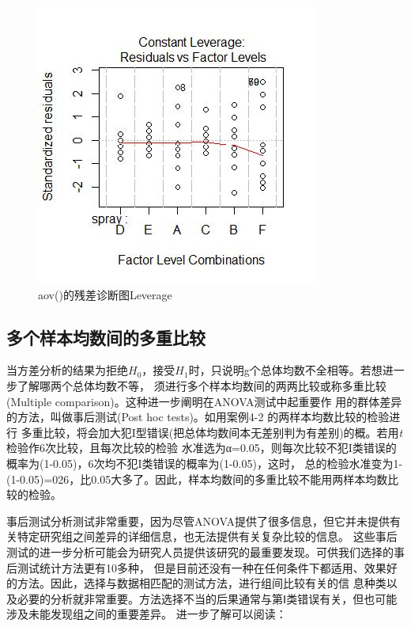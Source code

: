 \documentclass[
]{article}
\begin{document}
\begin{figure}

{\centering \includegraphics[width=0.6\linewidth]{image/diagnosticplots2} 

}

\caption{aov()的残差诊断图Leverage}\label{fig:diagnosticplots2}
\end{figure}

\hypertarget{ux591aux4e2aux6837ux672cux5747ux6570ux95f4ux7684ux591aux91cdux6bd4ux8f83}{%
\subsection{多个样本均数间的多重比较}\label{ux591aux4e2aux6837ux672cux5747ux6570ux95f4ux7684ux591aux91cdux6bd4ux8f83}}

当方差分析的结果为拒绝\(H_0\)，接受\(H_1\)时，只说明g个总体均数不全相等。若想进一步了解哪两个总体均数不等，
须进行多个样本均数间的两两比较或称多重比较(Multiple comparison)。这种进一步阐明在ANOVA测试中起重要作
用的群体差异的方法，叫做事后测试(Post hoc tests)。如用案例4-2 的两样本均数比较的检验进行
多重比较，将会加大犯I型错误(把总体均数间本无差别判为有差别)的概。若用\emph{t}检验作6次比较，且每次比较的检验
水准选为α=0.05，则每次比较不犯I类错误的概率为(1-0.05)，6次均不犯I类错误的概率为(1-0.05)，这时，
总的检验水准变为1-(1-0.05)=026，比0.05大多了。因此，样本均数间的多重比较不能用两样本均数比较的检验。

事后测试分析测试非常重要，因为尽管ANOVA提供了很多信息，但它并未提供有关特定研究组之间差异的详细信息，也无法提供有关复杂比较的信息。
这些事后测试的进一步分析可能会为研究人员提供该研究的最重要发现。可供我们选择的事后测试统计方法更有10多种，
但是目前还没有一种在任何条件下都适用、效果好的方法。因此，选择与数据相匹配的测试方法，进行组间比较有关的信
息种类以及必要的分析就非常重要。方法选择不当的后果通常与第Ⅰ类错误有关，但也可能涉及未能发现组之间的重要差异。
进一步了解可以阅读：
\end{document}
